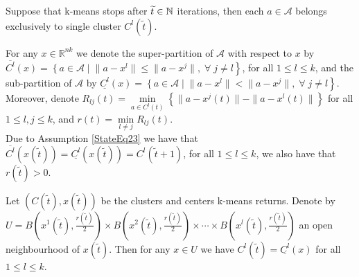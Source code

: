 \begin{assumption} \label{StateEq23}
Suppose that k-means stops after $\widetilde{t} \in \mathbb{N}$ iterations, then each $a \in \mathcal{A}$ belongs exclusively to single cluster $C^l(\widetilde{t})$.
\end{assumption}

For any $x \in \mathbb{R}^{nk}$ we denote the super-partition of $\mathcal{A}$ with respect to $x$ by $\overline{C^l}(x) = \left\lbrace a \in \mathcal{A} \mid \right. \left. \|a - x^l\| \leq \|a - x^j\| , \; \forall \; j \neq l \right\rbrace$, for all $1 \leq l \leq k$, and the sub-partition of $\mathcal{A}$ by $\underline{C^l}(x) = \left\lbrace a \in \mathcal{A} \mid \right. \left. \|a - x^l\| < \|a - x^j\|, \; \forall \; j \neq l \right\rbrace$.
Moreover, denote $R_{lj}(t) = \min\limits_{a \in C^l(t)} \left\lbrace \|a - x^j(t)\| - \|a - x^l(t)\| \right\rbrace$ for all $1 \leq l,j \leq k$, and $r(t) = \min\limits_{l \neq j} R_{lj}(t)$. \\
Due to Assumption \ref{StateEq23} we have that $\overline{C^l}(x(\widetilde{t})) = \underline{C^l}(x(\widetilde{t})) = C^l(\widetilde{t}+1)$, for all $1 \leq l \leq k$, we also have that $r(\widetilde{t}) > 0$.

\begin{proposition} \label{StateEq24}
Let $(C(\widetilde{t}), x(\widetilde{t}))$ be the clusters and centers k-means returns. Denote by $U = B\left( x^1(\widetilde{t}),\frac{r(\widetilde{t})}{2}\right) \times  B\left( x^2(\widetilde{t}),\frac{r(\widetilde{t})}{2}\right) \times \cdots \times B\left( x^l(\widetilde{t}),\frac{r(\widetilde{t})}{2} \right)$ an open neighbourhood of $x(\widetilde{t})$. Then for any $x \in U$ we have $C^l(\widetilde{t}) = \underline{C^l}(x)$ for all $1 \leq l \leq k$.
\end{proposition}

